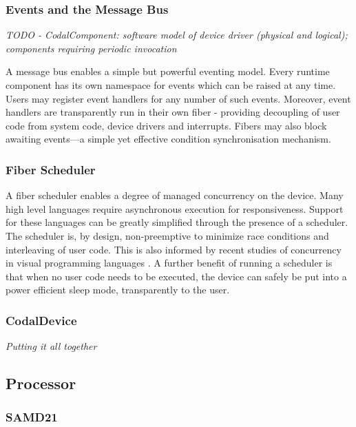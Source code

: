 

\subsubsection{Events and the Message Bus}

\emph{TODO - CodalComponent: software model of device driver (physical and logical); components requiring periodic invocation}

A message bus enables a simple but powerful eventing model. Every runtime component has its own namespace for events
which can be raised at any time. Users may register event handlers for any number of such events. Moreover, event handlers
are transparently run in their own fiber - providing decoupling of user code from system code, device drivers and interrupts.
Fibers may also block awaiting events---a simple yet effective condition synchronisation mechanism.

\subsubsection{Fiber Scheduler}

A fiber scheduler enables a degree of managed concurrency on the device. Many high level languages require asynchronous
execution for responsiveness. Support for these languages can be greatly simplified through the presence of a scheduler. 
The scheduler is, by design, non-preemptive to minimize race conditions and interleaving of user code. This is also informed
by recent studies of concurrency in visual programming languages \cite{meerbaum2013learning}. A further benefit of running a 
scheduler is that when no user code needs to be executed, the device can safely be put into a power efficient sleep mode,
transparently to the user.

\subsubsection{CodalDevice}

\emph{Putting it all together}


\subsection{Processor}

\subsubsection{SAMD21}
